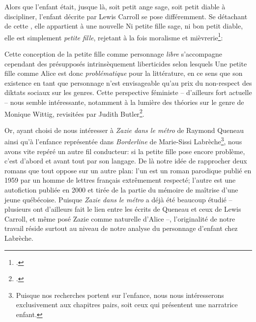 Alors que l'enfant était, jusque là, soit petit ange sage, soit petit diable à discipliner, l'enfant décrite par Lewis Carroll se pose différemment.
Se détachant de cette , elle appartient à une nouvelle 
Ni petite fille sage, ni bon petit diable, elle est simplement \textit{petite fille}, rejetant à la fois moralisme et mièvrerie\footcite[10]{Lecercle1998}: 
\par
Cette conception de la petite fille comme personnage \textit{libre} s'accompagne cependant des présupposés intrinsèquement liberticides selon lesquels 
Une petite fille comme Alice est donc \textit{problématique} pour la littérature, en ce sens que son existence en tant que personnage n'est envisageable qu'au prix du non-respect des diktats sociaux sur les genres.
Cette perspective féministe -- d'ailleurs fort actuelle -- nous semble intéressante, notamment à la lumière des théories sur le genre de Monique Wittig, revisitées par Judith Butler\footcite[222-247]{Butler2012}.
\par
Or, ayant choisi de nous intéresser à \textit{Zazie dans le métro} de Raymond Queneau ainsi qu'à l'enfance représentée dans \textit{Borderline} de Marie-Sissi Labrèche\footnote{Puisque nos recherches portent sur l'enfance, nous nous intéresserons exclusivement aux chapitres pairs, soit ceux qui présentent une narratrice enfant.}, nous avons vite repéré un autre fil conducteur: si la petite fille pose encore problème, c'est d'abord et avant tout par son langage.
De là notre idée de rapprocher deux romans que tout oppose sur un autre plan: l'un est un roman parodique publié en 1959 par un homme de lettres français extrêmement respecté; l'autre est une autofiction publiée en 2000 et tirée de la partie  du mémoire de maîtrise d'une jeune québécoise.
Puisque \textit{Zazie dans le métro} a déjà été beaucoup étudié -- plusieurs ont d'ailleurs fait le lien entre les écrits de Queneau et ceux de Lewis Carroll, et même posé Zazie comme  naturelle d'Alice --, l'originalité de notre travail réside surtout au niveau de notre analyse du personnage d'enfant chez Labrèche.
